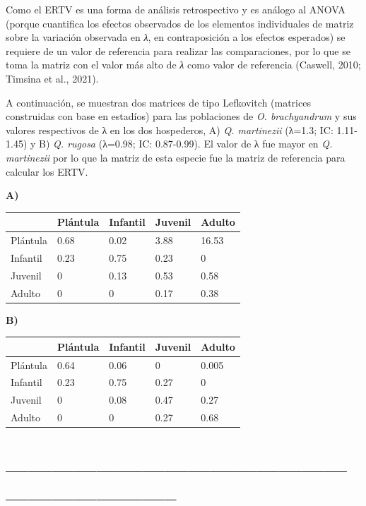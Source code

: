 \documentclass[
  12pt,
  letterpaper,
]{book}
\begin{document}
Como el ERTV es una forma de análisis retrospectivo y es análogo al
ANOVA (porque cuantifica los efectos observados de los elementos
individuales de matriz sobre la variación observada en \emph{λ}, en
contraposición a los efectos esperados) se requiere de un valor de
referencia para realizar las comparaciones, por lo que se toma la matriz
con el valor más alto de \emph{λ} como valor de referencia (Caswell,
2010; Timsina et al., 2021).

A continuación, se muestran dos matrices de tipo Lefkovitch (matrices
construidas con base en estadíos) para las poblaciones de \emph{O.
brachyandrum} y sus valores respectivos de λ en los dos hospederos, A)
\emph{Q. martinezii} (λ=1.3; IC: 1.11-1.45) y B) \emph{Q. rugosa}
(λ=0.98; IC: 0.87-0.99). El valor de λ fue mayor en \emph{Q. martinezii}
por lo que la matriz de esta especie fue la matriz de referencia para
calcular los ERTV.

\textbf{A)}

\begin{longtable}[]{@{}lllll@{}}
\toprule\noalign{}
& Plántula & Infantil & Juvenil & Adulto \\
\midrule\noalign{}
\endhead
\bottomrule\noalign{}
\endlastfoot
Plántula & 0.68 & 0.02 & 3.88 & 16.53 \\
Infantil & 0.23 & 0.75 & 0.23 & 0 \\
Juvenil & 0 & 0.13 & 0.53 & 0.58 \\
Adulto & 0 & 0 & 0.17 & 0.38 \\
\end{longtable}

\textbf{B)}

\begin{longtable}[]{@{}lllll@{}}
\toprule\noalign{}
& Plántula & Infantil & Juvenil & Adulto \\
\midrule\noalign{}
\endhead
\bottomrule\noalign{}
\endlastfoot
Plántula & 0.64 & 0.06 & 0 & 0.005 \\
Infantil & 0.23 & 0.75 & 0.27 & 0 \\
Juvenil & 0 & 0.08 & 0.47 & 0.27 \\
Adulto & 0 & 0 & 0.27 & 0.68 \\
\end{longtable}

\section{--------------------------------------------------------------------}\label{section}
\end{document}
